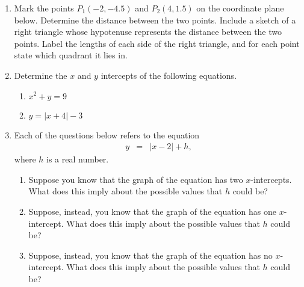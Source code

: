 \begin{enumerate}

\item Mark the points $P_1(-2,-4.5)$ and $P_2(4,1.5)$ on the
  coordinate plane below. Determine the distance between the two
  points.  Include a sketch of a right triangle whose hypotenuse
  represents the distance between the two points. Label the lengths of
  each side of the right triangle, and for each point state which
  quadrant it lies in.



\clearpage


\item Determine the $x$ and $y$ intercepts of the following equations.
\begin{enumerate}
\item $x^2+y=9$
  \vfill
\item $y=|x+4|-3$
  \vfill
\end{enumerate}

\item Each of the questions below refers to the equation
  \begin{eqnarray*}
    y & = & |x-2| + h,
  \end{eqnarray*}
  where $h$ is a real number.
  \begin{enumerate}
  \item Suppose you know that the graph of the equation has two
    $x$-intercepts. What does this imply about the possible values
    that $h$ could be?
    \vfill
  \item Suppose, instead, you know that the graph of the equation has
    one $x$-intercept. What does this imply about the possible values
    that $h$ could be?
    \vfill
  \item Suppose, instead, you know that the graph of the equation has no
    $x$-intercept. What does this imply about the possible values
    that $h$ could be?
    \vfill
  \end{enumerate}


\end{enumerate}
